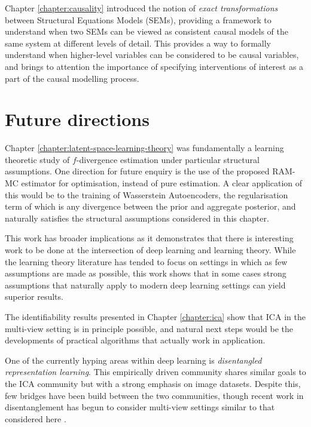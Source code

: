 Chapter \ref{chapter:causality} introduced the notion of \emph{exact transformations} between Structural Equations Models (SEMs), providing a framework to understand when two SEMs can be viewed as consistent causal models of the same system at different levels of detail. 
This provides a way to formally understand when higher-level variables can be considered to be causal variables, and brings to attention the importance of specifying interventions of interest as a part of the causal modelling process.


\section{Future directions}

Chapter \ref{chapter:latent-space-learning-theory} was fundamentally a learning theoretic study of $f$-divergence estimation under particular structural assumptions. 
One direction for future enquiry is the use of the proposed RAM-MC estimator for optimisation, instead of pure estimation. 
A clear application of this would be to the training of Wasserstein Autoencoders, the regularisation term of which is any divergence between the prior and aggregate posterior, and naturally satisfies the structural assumptions considered in this chapter.

This work has broader implications as it demonstrates that there is interesting work to be done at the intersection of deep learning and learning theory. 
While the learning theory literature has tended to focus on settings in which as few assumptions are made as possible, this work shows that in some cases strong assumptions that naturally apply to modern deep learning settings can yield superior results.

The identifiability results presented in Chapter \ref{chapter:ica} show that ICA in the multi-view setting is in principle possible, and natural next steps would be the developments of practical algorithms that actually work in application.

One of the currently hyping areas within deep learning is \emph{disentangled representation learning}. 
This empirically driven community shares similar goals to the ICA community but with a strong emphasis on image datasets.
Despite this, few bridges have been build between the two communities, though recent work in  disentanglement has begun to consider multi-view settings similar to that considered here \citep{shu2019weakly}.

